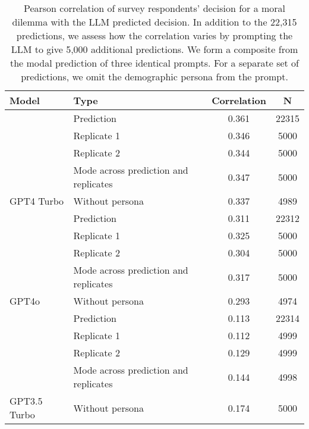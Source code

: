 \begin{table}[!h]
\centering
\caption{\label{tab:corr-tab}Pearson correlation of survey respondents' decision for a moral dilemma with the LLM predicted decision. In addition to the 22,315 predictions, we assess how the correlation varies by prompting the LLM to give 5,000 additional predictions. We form a composite from the modal prediction of three identical prompts. For a separate set of predictions, we omit the demographic persona from the prompt.}
\centering
\begin{tabular}[t]{llcc}
\toprule
Model & Type & Correlation & N\\
\midrule
 & Prediction & 0.361 & 22315\\
\cmidrule{2-4}
 & Replicate 1 & 0.346 & 5000\\
\cmidrule{2-4}
 & Replicate 2 & 0.344 & 5000\\
\cmidrule{2-4}
 & Mode across prediction and replicates & 0.347 & 5000\\
\cmidrule{2-4}
\multirow{-5}{*}{\raggedright\arraybackslash GPT4 Turbo} & Without persona & 0.337 & 4989\\
\cmidrule{1-4}
 & Prediction & 0.311 & 22312\\
\cmidrule{2-4}
 & Replicate 1 & 0.325 & 5000\\
\cmidrule{2-4}
 & Replicate 2 & 0.304 & 5000\\
\cmidrule{2-4}
 & Mode across prediction and replicates & 0.317 & 5000\\
\cmidrule{2-4}
\multirow{-5}{*}{\raggedright\arraybackslash GPT4o} & Without persona & 0.293 & 4974\\
\cmidrule{1-4}
 & Prediction & 0.113 & 22314\\
\cmidrule{2-4}
 & Replicate 1 & 0.112 & 4999\\
\cmidrule{2-4}
 & Replicate 2 & 0.129 & 4999\\
\cmidrule{2-4}
 & Mode across prediction and replicates & 0.144 & 4998\\
\cmidrule{2-4}
\multirow{-5}{*}{\raggedright\arraybackslash GPT3.5 Turbo} & Without persona & 0.174 & 5000\\
\bottomrule
\end{tabular}
\end{table}
